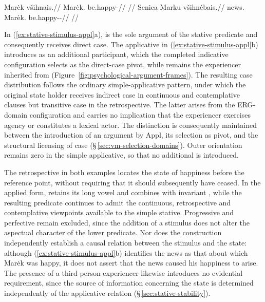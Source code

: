 \pex\label{ex:stative-stimulus-appl}
\a
\begingl
\gla Marėk všihnais.//
\glb Marėk.\Dir{} be.happy-\Ret{}//
\glft {}//
\endgl
\a
\begingl
\gla Senica Marku všihnébais.//
\glb news.\Dir{} Marėk.\Trs{} be.happy-\Appl{}-\Ret{}//
\glft {}//
\endgl
\xe

In (\ref{ex:stative-stimulus-appl}a),  is the sole argument of
the stative predicate and consequently receives direct case. The
applicative in (\ref{ex:stative-stimulus-appl}b) introduces 
 as an additional participant, which the completed indicative
configuration selects as the direct-case pivot, while 
remains the experiencer inherited from 
(Figure~\ref{fig:psychological-argument-frames}). The resulting case
distribution follows the ordinary simple-applicative pattern, under which
the original state holder receives indirect case in continuous and
contemplative clauses but transitive case in the retrospective. The latter
arises from the ERG-domain configuration and carries no implication that
the experiencer exercises agency or constitutes a lexical actor. The
distinction is consequently maintained between the introduction of an
argument by Appl, its selection as pivot, and the structural licensing of
case (§\,\ref{sec:vm-selection-domains}). Outer orientation remains zero
in the simple applicative, so that no additional  is introduced.

The retrospective in both examples locates the state of happiness before
the reference point, without requiring that it should subsequently have
ceased. In the applied form,  retains its long vowel and
combines with invariant , while the resulting predicate continues to admit
the continuous, retrospective and contemplative viewpoints available to
the simple stative. Progressive and perfective remain excluded, since the
addition of a stimulus does not alter the aspectual character of the lower
predicate. Nor does the construction independently establish a causal
relation between the stimulus and the state: although
(\ref{ex:stative-stimulus-appl}b) identifies the news as that about which
Marėk was happy, it does not assert that the news caused his happiness to
arise. The presence of a third-person experiencer likewise introduces no
evidential requirement, since the source of information concerning the
state is determined independently of the applicative relation
(§\,\ref{sec:stative-stability}).

